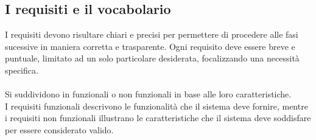 \subsection{I requisiti e il vocabolario}
I requisiti devono risultare chiari e precisi
per permettere di procedere alle fasi sucessive in maniera corretta e trasparente.
Ogni requisito deve essere breve e puntuale, limitato ad un solo particolare desiderata,
focalizzando una necessità specifica.\\
\\
Si suddividono in funzionali o non funzionali in base alle loro caratteristiche.\\
I requisiti funzionali descrivono le funzionalità che il sistema deve fornire,
mentre i requisiti non funzionali illustrano le caratteristiche che il sistema deve soddisfare per essere considerato valido.\\

